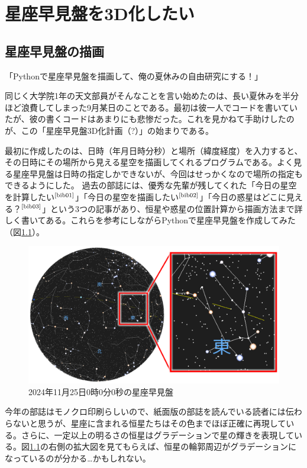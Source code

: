 \documentclass[../main]{subfiles}
\begin{document}
\chapter{星座早見盤を3D化したい} %


\section{星座早見盤の描画}
「Pythonで星座早見盤を描画して、俺の夏休みの自由研究にする！」

同じく大学院1年の天文部員がそんなことを言い始めたのは、長い夏休みを半分ほど浪費してしまった9月某日のことである。最初は彼一人でコードを書いていたが、彼の書くコードはあまりにも悲惨だった。これを見かねて手助けしたのが、この「星座早見盤3D化計画（?）」の始まりである。

最初に作成したのは、日時（年月日時分秒）と場所（緯度経度）を入力すると、その日時にその場所から見える星空を描画してくれるプログラムである。よく見る星座早見盤は日時の指定しかできないが、今回はせっかくなので場所の指定もできるようにした。
過去の部誌には、優秀な先輩が残してくれた「今日の星空を計算したい$^\text{\cite{bib01}}$」「今日の星空を描画したい$^\text{\cite{bib02}}$」「今日の惑星はどこに見える？$^\text{\cite{bib03}}$」という3つの記事があり、恒星や惑星の位置計算から描画方法まで詳しく書いてある。これらを参考にしながらPythonで星座早見盤を作成してみた（図\ref{fig01}）。
\begin{figure}[H]
  \centering
  \label{fig01}
  \includegraphics[width=15cm]{sections/Fujisawa/image/planisphere_normal.png}
  \caption{2024年11月25日0時0分0秒の星座早見盤}
\end{figure}
今年の部誌はモノクロ印刷らしいので、紙面版の部誌を読んでいる読者には伝わらないと思うが、星座に含まれる恒星たちはその色までほぼ正確に再現している。さらに、一定以上の明るさの恒星はグラデーションで星の輝きを表現している。図\ref{fig01}の右側の拡大図を見てもらえば、恒星の輪郭周辺がグラデーションになっているのが分かる…かもしれない。
\end{document}
